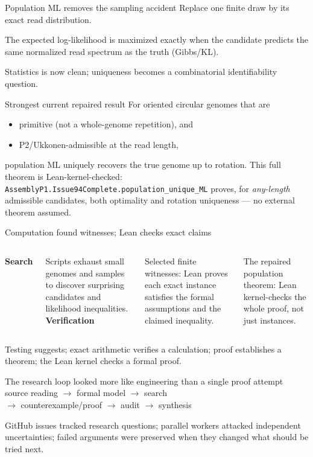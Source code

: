 \documentclass[aspectratio=169]{beamer}
\begin{document}
\begin{frame}{Population ML removes the sampling accident}
\centering
\Large Replace one finite draw by its exact read distribution.\par\bigskip
\normalsize The expected log-likelihood is maximized exactly when the candidate predicts the same normalized read spectrum as the truth (Gibbs/KL).\par\bigskip
\alert{Statistics is now clean; uniqueness becomes a combinatorial identifiability question.}
\end{frame}

\begin{frame}{Strongest current repaired result}
\Large
For oriented circular genomes that are
\begin{itemize}
\item primitive (not a whole-genome repetition), and
\item P2/Ukkonen-admissible at the read length,
\end{itemize}
population ML uniquely recovers the true genome up to rotation.
\vfill
\normalsize \alert{This full theorem is Lean-kernel-checked}: \texttt{AssemblyP1.Issue94Complete.population\_unique\_ML} proves, for \emph{any-length} admissible candidates, both optimality and rotation uniqueness --- no external theorem assumed.
\end{frame}

\begin{frame}{Computation found witnesses; Lean checks exact claims}
\begin{columns}[T]
\textbf{Search}\par\medskip
Scripts exhaust small genomes and samples to discover surprising candidates and likelihood inequalities.
\textbf{Verification}\par\medskip
Selected finite witnesses: Lean proves each exact instance satisfies the formal assumptions and the claimed inequality.\par\medskip
The repaired population theorem: Lean kernel-checks the whole proof, not just instances.
\end{columns}
\vfill
\alert{Testing suggests; exact arithmetic verifies a calculation; proof establishes a theorem; the Lean kernel checks a formal proof.}
\end{frame}

\begin{frame}{The research loop looked more like engineering than a single proof attempt}
\centering
\Large source reading $\rightarrow$ formal model $\rightarrow$ search\\[.6em]
$\rightarrow$ counterexample/proof $\rightarrow$ audit $\rightarrow$ synthesis
\par\bigskip
\normalsize GitHub issues tracked research questions; parallel workers attacked independent uncertainties; failed arguments were preserved when they changed what should be tried next.
\end{frame}
\end{document}
